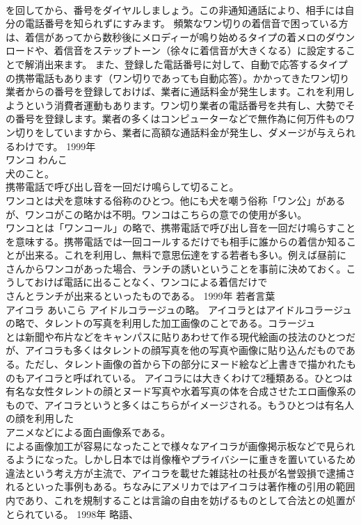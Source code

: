 \documentclass[8pt]{extreport}
\begin{document}
\begin{CJK}{UTF8}{min}
\\	を回してから、番号をダイヤルしましょう。この非通知通話により、相手には自分の電話番号を知られずにすみます。 頻繁なワン切りの着信音で困っている方は、着信があってから数秒後にメロディーが鳴り始めるタイプの着メロのダウンロードや、着信音をステップトーン（徐々に着信音が大きくなる）に設定することで解消出来ます。 また、登録した電話番号に対して、自動で応答するタイプの携帯電話もあります（ワン切りであっても自動応答）。かかってきたワン切り業者からの番号を登録しておけば、業者に通話料金が発生します。これを利用しようという消費者運動もあります。ワン切り業者の電話番号を共有し、大勢でその番号を登録します。業者の多くはコンピューターなどで無作為に何万件ものワン切りをしていますから、業者に高額な通話料金が発生し、ダメージが与えられるわけです。	1999年	
\\	ワンコ	わんこ	
\\	犬のこと。 
\\	携帯電話で呼び出し音を一回だけ鳴らして切ること。	
\\	ワンコとは犬を意味する俗称のひとつ。他にも犬を嘲う俗称「ワン公」があるが、ワンコがこの略かは不明。ワンコはこちらの意での使用が多い。 
\\	ワンコとは「ワンコール」の略で、携帯電話で呼び出し音を一回だけ鳴らすことを意味する。携帯電話では一回コールするだけでも相手に誰からの着信か知ることが出来る。これを利用し、無料で意思伝達をする若者も多い。例えば昼前に
\\	さんからワンコがあった場合、ランチの誘いということを事前に決めておく。こうしておけば電話に出ることなく、ワンコによる着信だけで
\\	さんとランチが出来るといったものである。	1999年	若者言葉	
\\	アイコラ	あいこら	アイドルコラージュの略。	アイコラとはアイドルコラージュの略で、タレントの写真を利用した加工画像のことである。コラージュ
\\	とは新聞や布片などをキャンパスに貼りあわせて作る現代絵画の技法のひとつだが、アイコラも多くはタレントの顔写真を他の写真や画像に貼り込んだものである。ただし、タレント画像の首から下の部分にヌード絵など上書きで描かれたものもアイコラと呼ばれている。 アイコラには大きくわけて2種類ある。ひとつは有名な女性タレントの顔とヌード写真や水着写真の体を合成させたエロ画像系のもので、アイコラというと多くはこちらがイメージされる。もうひとつは有名人の顔を利用した
\\	アニメなどによる面白画像系である。 
\\	による画像加工が容易になったことで様々なアイコラが画像掲示板などで見られるようになった。しかし日本では肖像権やプライバシーに重きを置いているため違法という考え方が主流で、アイコラを載せた雑誌社の社長が名誉毀損で逮捕されるといった事例もある。ちなみにアメリカではアイコラは著作権の引用の範囲内であり、これを規制することは言論の自由を妨げるものとして合法との処置がとられている。	1998年	略語、

\end{CJK}
\end{document}
